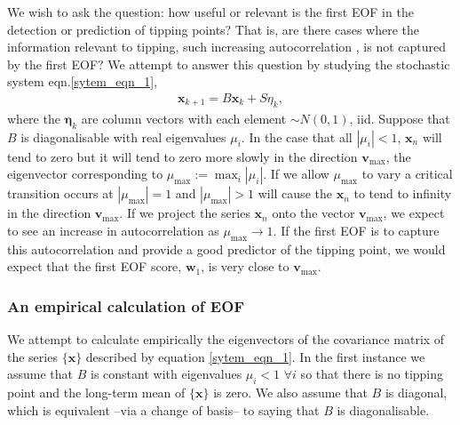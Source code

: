 \documentclass[11pt,a4paper,reqno]{article}
\numberwithin{equation}{section}
\newcommand{\x}{{\mathbf x}}
\newcommand{\etab}{{\mathbf \eta}}
\begin{document}
We wish to ask the question: how useful or relevant is the first EOF in the detection or prediction of tipping points? That is, are there cases where the information relevant to tipping, such increasing autocorrelation \citep{scheffer2009}, is not captured by the first EOF? We attempt to answer this question by studying the stochastic system eqn.\ref{sytem_eqn_1},
\begin{align}
\x_{k+1} = B\x_k + S\eta_k,
\label{sytem_eqn_1}
\end{align}
where the $\etab_k$ are column vectors with each element $\sim N(0,1)$, iid. Suppose that $B$ is diagonalisable with real eigenvalues $\mu_{i}$. In the case that all $|\mu_{i}|<1$, $\x_n$ will tend to zero but it will tend to zero more slowly in the direction $\mathbf{v}_{\max}$, the eigenvector corresponding to $\mu_{\max} := \max_{i}|\mu_{i}|$. If we allow $\mu_{\max}$ to vary a critical transition occurs at $|\mu_{\max}|=1$ and $|\mu_{\max}|>1$ will cause the $\x_n$ to tend to infinity in the direction $\mathbf{v}_{\max}$. If we project the series $\x_n$ onto the vector $\mathbf{v}_{\max}$, we expect to see an increase in autocorrelation as $\mu_{\max} \rightarrow 1$. If the first EOF is to capture this autocorrelation and provide a good predictor of the tipping point, we would expect that the first EOF score, $\mathbf{w}_1$, is very close to $\mathbf{v}_{\max}$. \\

\subsubsection{An empirical calculation of EOF}
We attempt to calculate empirically the eigenvectors of the covariance matrix of the series $\{\x\}$ described by equation \ref{sytem_eqn_1}. In the first instance we assume that $B$ is constant with eigenvalues $\mu_i<1$ $\forall i$ so that there is no tipping point and the long-term mean of $\{\x\}$ is zero. We also assume that $B$ is diagonal, which is equivalent --via a change of basis-- to saying that $B$ is diagonalisable. \\
\end{document}
